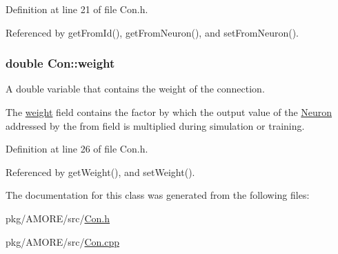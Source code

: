 Definition at line 21 of file Con.h.



Referenced by getFromId(), getFromNeuron(), and setFromNeuron().

\hypertarget{class_con_a7f46485ba5b41971ea38641f9e7d1be0}{
\subsubsection[{weight}]{\setlength{\rightskip}{0pt plus 5cm}double {\bf Con::weight}}}
\label{class_con_a7f46485ba5b41971ea38641f9e7d1be0}


A double variable that contains the weight of the connection. 

The \hyperlink{class_con_a7f46485ba5b41971ea38641f9e7d1be0}{weight} field contains the factor by which the output value of the \hyperlink{class_neuron}{Neuron} addressed by the from field is multiplied during simulation or training. 

Definition at line 26 of file Con.h.



Referenced by getWeight(), and setWeight().



The documentation for this class was generated from the following files:\begin{DoxyCompactItemize}
\item 
pkg/AMORE/src/\hyperlink{_con_8h}{Con.h}\item 
pkg/AMORE/src/\hyperlink{_con_8cpp}{Con.cpp}\end{DoxyCompactItemize}

